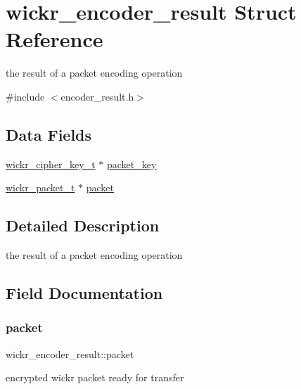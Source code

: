 \hypertarget{structwickr__encoder__result}{}\section{wickr\+\_\+encoder\+\_\+result Struct Reference}
\label{structwickr__encoder__result}


the result of a packet encoding operation  




{\ttfamily \#include $<$encoder\+\_\+result.\+h$>$}

\subsection*{Data Fields}
\begin{DoxyCompactItemize}
\item 
\mbox{\hyperlink{structwickr__cipher__key}{wickr\+\_\+cipher\+\_\+key\+\_\+t}} $\ast$ \mbox{\hyperlink{structwickr__encoder__result_a5a712f2087fb15d2dd5a870a656afbb5}{packet\+\_\+key}}
\item 
\mbox{\hyperlink{structwickr__packet}{wickr\+\_\+packet\+\_\+t}} $\ast$ \mbox{\hyperlink{structwickr__encoder__result_a0b82542fc5bae37ab2a8924605927b4a}{packet}}
\end{DoxyCompactItemize}


\subsection{Detailed Description}
the result of a packet encoding operation 

\subsection{Field Documentation}
\mbox{\label{structwickr__encoder__result_a0b82542fc5bae37ab2a8924605927b4a}} 
\subsubsection{\texorpdfstring{packet}{packet}}
{\footnotesize\ttfamily wickr\+\_\+encoder\+\_\+result\+::packet}

encrypted wickr packet ready for transfer \mbox{\label{structwickr__encoder__result_a5a712f2087fb15d2dd5a870a656afbb5}} 
